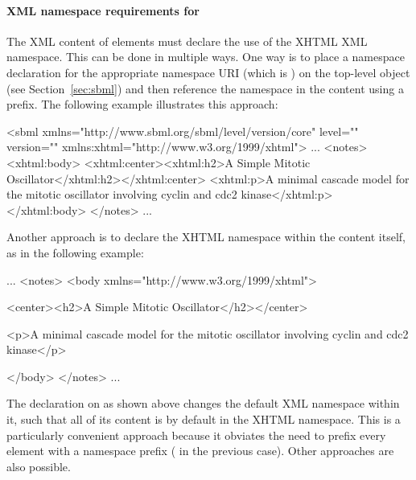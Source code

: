 

\paragraph{XML namespace requirements for }

The XML content of  elements must declare the use of
the XHTML XML namespace.  This can be done in multiple ways.  One
way is to place a namespace declaration for the appropriate
namespace URI (which is ) on the
top-level \Sbml object (see Section~\ref{sec:sbml}) and then
reference the namespace in the  content using a
prefix.  The following example illustrates this approach:

\begin{example}
<sbml xmlns="http://www.sbml.org/sbml/level\sbmllevel/version\sbmlversionnum/core" level="\sbmllevel" version="\sbmlversionnum"
      xmlns:xhtml="http://www.w3.org/1999/xhtml">
  ...
  <notes>
    <xhtml:body>
      <xhtml:center><xhtml:h2>A Simple Mitotic Oscillator</xhtml:h2></xhtml:center>
      <xhtml:p>A minimal cascade model for the mitotic oscillator
      involving cyclin and cdc2 kinase</xhtml:p>
    </xhtml:body>
  </notes>
  ...
\end{example}

Another approach is to declare the XHTML namespace within the
 content itself, as in the following example:

\begin{example}
...
<notes>
  <body xmlns="http://www.w3.org/1999/xhtml">

    <center><h2>A Simple Mitotic Oscillator</h2></center>

    <p>A minimal cascade model for the mitotic oscillator
    involving cyclin and cdc2 kinase</p>

  </body>
</notes>
...
\end{example}

The  declaration on
 as shown above changes the default XML namespace
within it, such that all of its content is by default in the XHTML
namespace.  This is a particularly convenient approach because it
obviates the need to prefix every element with a namespace prefix
(\ie {} in the previous case).  Other
approaches are also possible.


